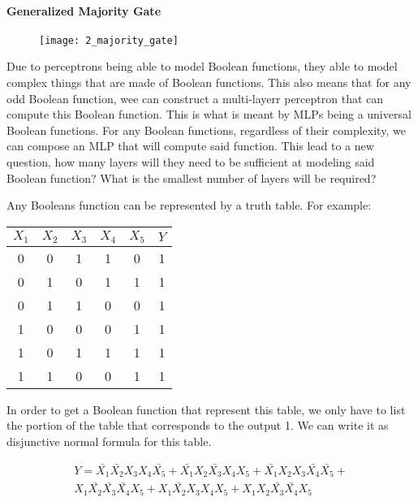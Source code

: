 \paragraph{Generalized Majority Gate}

\begin{figure}[H]
	\centering
	\texttt{[image: 2\_majority\_gate]}
\end{figure}

\hfill\break
Due to perceptrons being able to model Boolean functions, they able to model complex things that are made of Boolean functions. This also means that for any odd Boolean function, wee can construct a multi-layerr perceptron that can compute this Boolean function. This is what is meant by MLPs being a universal Boolean functions. For any Boolean functions, regardless of their complexity, we can compose an MLP that will compute said function. This lead to a new question, how many layers will they need to be sufficient at modeling said Boolean function? What is the smallest number of layers will be required?


\hfill\break
Any Booleans function can be represented by a truth table. For example:


\begin{table}[H]
	\centering
	\begin{tabular}{|c|c|c|c|c|c|}
			\hline
			$X_1$    & $X_2$     & $X_3$    & $X_4$    & $X_5$    & $Y$   \\
			\hline
			0        & 0        & 1        & 1        & 0        & 1     \\
			0        & 1        & 0        & 1        & 1        & 1     \\
			0        & 1        & 1        & 0        & 0        & 1     \\
			1        & 0        & 0        & 0        & 1        & 1     \\
			1        & 0        & 1        & 1        & 1        & 1     \\
			1        & 1        & 0        & 0        & 1        & 1     \\
			\hline
	\end{tabular}
\end{table}

\hfill\break
In order to get a Boolean function that represent this table, we only have to list the portion of the table that corresponds to the output 1. We can write it as disjunctive normal formula for this table. 

\begin{align}
	Y = \bar{X_1}\bar{X_2}X_3X_4\bar{X_5} + \bar{X_1}X_2\bar{X_3}X_4X_5 + \bar{X_1}X_2X_3\bar{X_4}\bar{X_5} +\\ X_1\bar{X_2}\bar{X_3}\bar{X_4}X_5 + X_1\bar{X_2}X_3X_4X_5 + X_1X_2\bar{X_3}\bar{X_4}X_5
\end{align}

